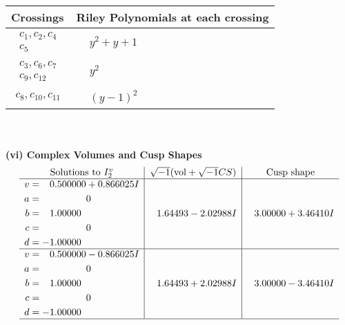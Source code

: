 \documentclass[1p]{elsarticle_modified}
\theoremstyle{definition}
\newcommand{\I}{\sqrt{-1}}
\begin{document}
\begin{tabular}{m{50pt}|m{274pt}}
Crossings & \hspace{64pt}Riley Polynomials at each crossing \\
\hline $$\begin{aligned}c_{1},c_{2},c_{4}\\c_{5}\end{aligned}$$&$\begin{aligned}
&y^2+y+1
\end{aligned}$\\
\hline $$\begin{aligned}c_{3},c_{6},c_{7}\\c_{9},c_{12}\end{aligned}$$&$\begin{aligned}
&y^2
\end{aligned}$\\
\hline $$\begin{aligned}c_{8},c_{10},c_{11}\end{aligned}$$&$\begin{aligned}
&(y-1)^2
\end{aligned}$\\
\hline
\end{tabular}\\~\\
\newpage\flushleft \textbf{(vi) Complex Volumes and Cusp Shapes}
$$\begin{array}{c|c|c}  
\text{Solutions to }I^v_{2}& \I (\text{vol} + \sqrt{-1}CS) & \text{Cusp shape}\\
 \hline 
\begin{aligned}
v &= \phantom{-}0.500000 + 0.866025 I \\
a &= \phantom{-0.000000 } 0 \\
b &= \phantom{-}1.00000\phantom{ +0.000000I} \\
c &= \phantom{-0.000000 } 0 \\
d &= -1.00000\phantom{ +0.000000I}\end{aligned}
 & \phantom{-}1.64493 - 2.02988 I & \phantom{-}3.00000 + 3.46410 I \\ \hline\begin{aligned}
v &= \phantom{-}0.500000 - 0.866025 I \\
a &= \phantom{-0.000000 } 0 \\
b &= \phantom{-}1.00000\phantom{ +0.000000I} \\
c &= \phantom{-0.000000 } 0 \\
d &= -1.00000\phantom{ +0.000000I}\end{aligned}
 & \phantom{-}1.64493 + 2.02988 I & \phantom{-}3.00000 - 3.46410 I\\
 \hline 
 \end{array}$$\newpage\newpage\renewcommand{\arraystretch}{1}
\end{document}
